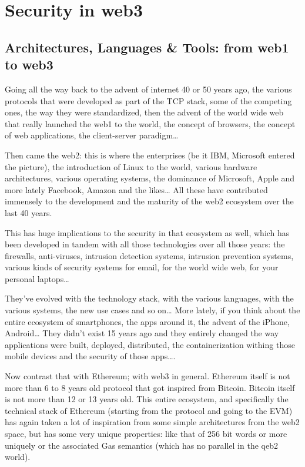 \section{Security in web3}\label{security-in-web3}

\subsection{Architectures, Languages \& Tools: from web1 to
web3}\label{architectures-languages-tools-from-web1-to-web3}

Going all the way back to the advent of internet 40 or 50 years ago, the
various protocols that were developed as part of the TCP stack, some of
the competing ones, the way they were standardized, then the advent of
the world wide web that really launched the web1 to the world, the
concept of browsers, the concept of web applications, the client-server
paradigm\ldots{}

Then came the web2: this is where the enterprises (be it IBM, Microsoft
entered the picture), the introduction of Linux to the world, various
hardware architectures, various operating systems, the dominance of
Microsoft, Apple and more lately Facebook, Amazon and the likes\ldots{}
All these have contributed immensely to the development and the maturity
of the web2 ecosystem over the last 40 years.

This has huge implications to the security in that ecosystem as well,
which has been developed in tandem with all those technologies over all
those years: the firewalls, anti-viruses, intrusion detection systems,
intrusion prevention systems, various kinds of security systems for
email, for the world wide web, for your personal laptops\ldots{}

They've evolved with the technology stack, with the various languages,
with the various systems, the new use cases and so on\ldots{} More
lately, if you think about the entire ecosystem of smartphones, the apps
around it, the advent of the iPhone, Android\ldots{} They didn't exist
15 years ago and they entirely changed the way applications were built,
deployed, distributed, the containerization withing those mobile devices
and the security of those apps\ldots.

Now contrast that with Ethereum; with web3 in general. Ethereum itself
is not more than 6 to 8 years old protocol that got inspired from
Bitcoin. Bitcoin itself is not more than 12 or 13 years old. This entire
ecosystem, and specifically the technical stack of Ethereum (starting
from the protocol and going to the EVM) has again taken a lot of
inspiration from some simple architectures from the web2 space, but has
some very unique properties: like that of 256 bit words or more uniquely
or the associated Gas semantics (which has no parallel in the qeb2
world).

